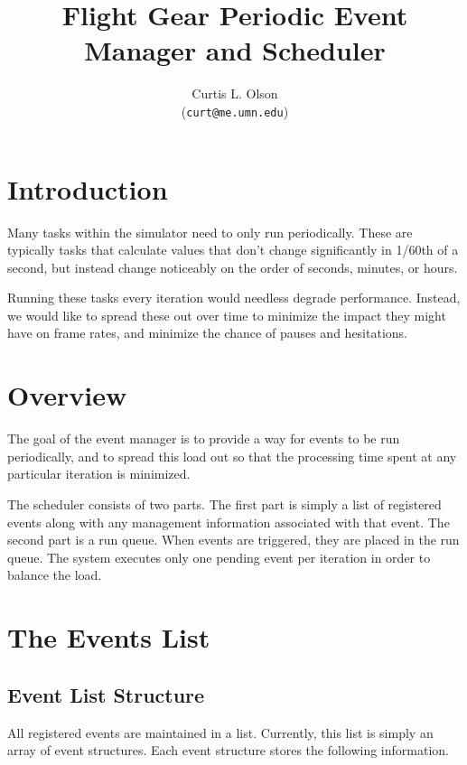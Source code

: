 \documentclass[12pt]{article}
\begin{document}
\title{
  Flight Gear Periodic Event Manager and Scheduler
}


\author{
    Curtis L. Olson\\ 
    (\texttt{curt@me.umn.edu})
}


\maketitle


\section{Introduction}

Many tasks within the simulator need to only run periodically.  These
are typically tasks that calculate values that don't change
significantly in 1/60th of a second, but instead change noticeably on
the order of seconds, minutes, or hours.

Running these tasks every iteration would needless degrade
performance.  Instead, we would like to spread these out over time to
minimize the impact they might have on frame rates, and minimize the
chance of pauses and hesitations.

\section{Overview}

The goal of the event manager is to provide a way for events to be run
periodically, and to spread this load out so that the processing time
spent at any particular iteration is minimized.

The scheduler consists of two parts.  The first part is simply a list
of registered events along with any management information associated
with that event.  The second part is a run queue.  When events are
triggered, they are placed in the run queue.  The system executes only
one pending event per iteration in order to balance the load.

\section{The Events List}

\subsection{Event List Structure}

All registered events are maintained in a list.  Currently, this list
is simply an array of event structures.  Each event structure stores
the following information.
\end{document}
